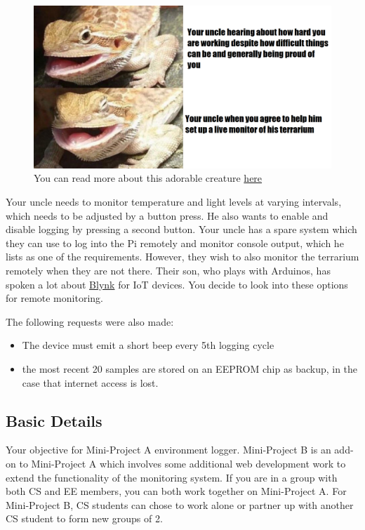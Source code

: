 \begin{figure}[H]
\centering
\includegraphics[width=0.7\columnwidth]{Figures/uncledragon.png}
\caption{You can read more about this adorable creature \href{https://knowyourmeme.com/memes/butter-the-bearded-dragon}{here}}
\label{ButterDragon}
\end{figure}

Your uncle needs to monitor temperature and light levels at varying intervals, which needs to be adjusted by a button press. He also wants to enable and disable logging by pressing a second button. Your uncle has a spare system which they can use to log into the Pi remotely and monitor console output, which he lists as one of the requirements. However, they wish to also monitor the terrarium remotely when they are not there. Their son, who plays with Arduinos, has spoken a lot about \href{https://blynk.io/}{Blynk} for IoT devices. You decide to look into these options for remote monitoring. 

The following requests were also made:
\begin{itemize}
    \item The device must emit a short beep every 5th logging cycle
    \item the most recent 20 samples are stored on an EEPROM chip as backup, in the case that internet access is lost.
\end{itemize}


\subsection{Basic Details}
Your objective for Mini-Project A environment logger. Mini-Project B is an add-on to Mini-Project A which involves some additional web development work to extend the functionality of the monitoring system. If you are in a group with both CS and EE members, you can both work together on Mini-Project A. For Mini-Project B, CS students can chose to work alone or partner up with another CS student to form new groups of 2.

